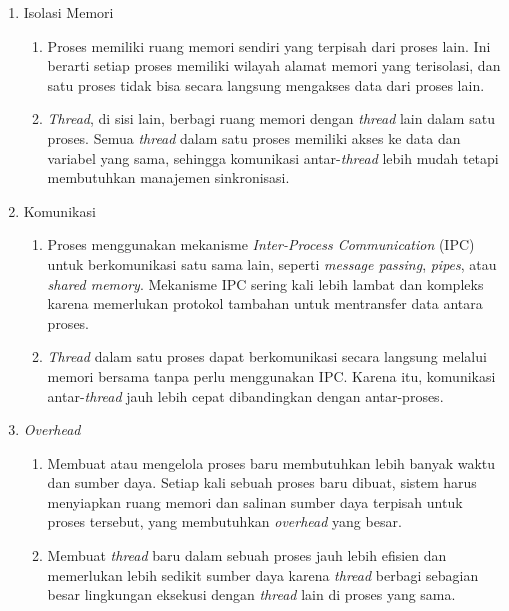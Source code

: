 \documentclass[12pt]{article}
\begin{document}
      \begin{enumerate}
          \item Isolasi Memori
                \begin{enumerate}
                    \item Proses memiliki ruang memori sendiri yang terpisah dari proses lain. Ini berarti setiap proses memiliki wilayah alamat memori yang terisolasi, dan satu proses tidak bisa secara langsung mengakses data dari proses lain.
                    \item \textit{Thread}, di sisi lain, berbagi ruang memori dengan \textit{thread} lain dalam satu proses. Semua \textit{thread} dalam satu proses memiliki akses ke data dan variabel yang sama, sehingga komunikasi antar-\textit{thread} lebih mudah tetapi membutuhkan manajemen sinkronisasi.
                \end{enumerate}
          \item Komunikasi
                \begin{enumerate}
                    \item Proses menggunakan mekanisme \textit{Inter-Process Communication} (IPC) untuk berkomunikasi satu sama lain, seperti \textit{message passing}, \textit{pipes}, atau \textit{shared memory}. Mekanisme IPC sering kali lebih lambat dan kompleks karena memerlukan protokol tambahan untuk mentransfer data antara proses.
                    \item \textit{Thread} dalam satu proses dapat berkomunikasi secara langsung melalui memori bersama tanpa perlu menggunakan IPC. Karena itu, komunikasi antar-\textit{thread} jauh lebih cepat dibandingkan dengan antar-proses.
                \end{enumerate}
          \item \textit{Overhead}
                \begin{enumerate}
                    \item Membuat atau mengelola proses baru membutuhkan lebih banyak waktu dan sumber daya. Setiap kali sebuah proses baru dibuat, sistem harus menyiapkan ruang memori dan salinan sumber daya terpisah untuk proses tersebut, yang membutuhkan \textit{overhead} yang besar.
                    \item Membuat \textit{thread} baru dalam sebuah proses jauh lebih efisien dan memerlukan lebih sedikit sumber daya karena \textit{thread} berbagi sebagian besar lingkungan eksekusi dengan \textit{thread} lain di proses yang sama.
                \end{enumerate}

\end{enumerate}
\end{document}
